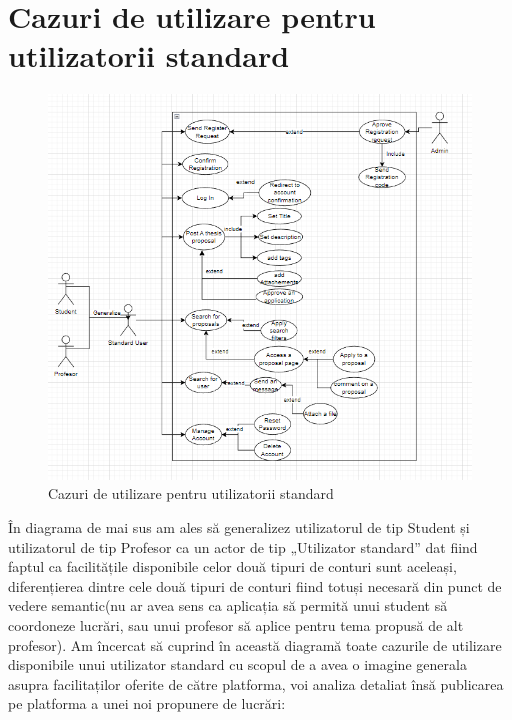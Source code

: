 \documentclass[12pt,a4paper,hidelinks]{report}
\theoremstyle{definition}
\theoremstyle{remark}
\begin{document}
\section{Cazuri de utilizare pentru utilizatorii standard}
\begin{figure}[h]
    \centering
    \includegraphics[scale=0.5]{images/StandardUserUseCase.png}
    \caption{Cazuri de utilizare pentru utilizatorii standard}
    \label{fig:stdUserDiagram}
\end{figure}
În diagrama de mai sus am ales să generalizez utilizatorul de tip Student și utilizatorul de tip Profesor ca un actor de tip „Utilizator standard” dat fiind faptul ca facilitățile disponibile celor  două tipuri de conturi sunt aceleași, diferențierea dintre cele două tipuri de conturi fiind totuși  necesară din punct de vedere semantic(nu ar avea sens ca aplicația să permită unui student să coordoneze lucrări, sau unui profesor să aplice pentru tema propusă de alt profesor). Am încercat să cuprind în această diagramă toate cazurile de utilizare disponibile  unui utilizator standard cu scopul de a avea o imagine generala asupra facilitaților oferite de către platforma, voi analiza detaliat însă publicarea pe platforma a unei noi propunere de lucrări:
\end{document}
